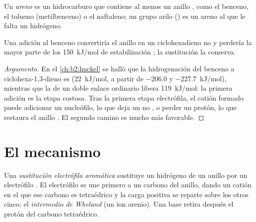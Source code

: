 \begin{definition}[Areno]\label{def:b2:aromatic-substitution:arene}
Un \emph{areno} es un hidrocarburo que contiene al menos un anillo , como el
benceno, el tolueno (metilbenceno) o el naftaleno; un grupo arilo () es un areno al que le falta
un hidrógeno.
\end{definition}

\begin{proposition}\label{prop:b2:aromatic-substitution:no-addition}
Una adición al benceno convertiría el anillo  en un ciclohexadieno no  y
perdería la mayor parte de los \qty{150}{kJ/mol} de estabilización ; la sustitución la conserva.
\end{proposition}

\begin{proof}[Argumento]
En el \cref{ch:b2:huckel} se halló que la hidrogenación del benceno a ciclohexa-1,3-dieno es
 (\qty{+22}{kJ/mol}, a partir de \qty{-206.0}{} y \qty{-227.7}{kJ/mol}), mientras que la de un
doble enlace ordinario libera \qty{119}{kJ/mol}: la primera adición es la etapa costosa.
Tras la primera etapa electrófila, el catión formado puede adicionar un nucleófilo, lo que
deja un  no , o perder un protón, lo que restaura el anillo . El segundo
camino es mucho más favorable.
\end{proof}

\section{El mecanismo}

\begin{definition}\label{def:b2:aromatic-substitution:seAr}
Una \emph{sustitución electrófila aromática}
sustituye un hidrógeno de un anillo  por un electrófilo . El electrófilo se
une primero a un carbono del anillo, dando un catión en el que ese carbono es tetraédrico y la
carga positiva se reparte sobre los otros cinco: el \emph{intermedio de Wheland}
(un ion arenio). Una base retira después el protón del carbono tetraédrico.
\end{definition}

